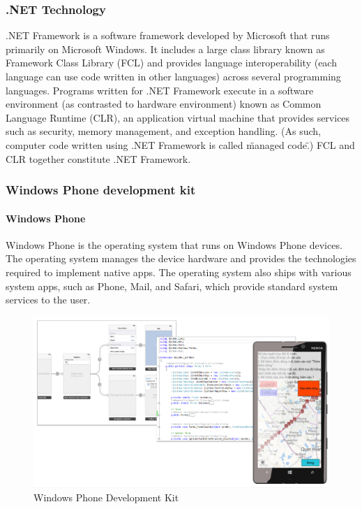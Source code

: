 \subsubsection{.NET Technology}
	.NET Framework is a software framework developed by Microsoft that runs primarily on Microsoft Windows. It includes a large class library known as Framework Class Library (FCL) and provides language interoperability (each language can use code written in other languages) across several programming languages. Programs written for .NET Framework execute in a software environment (as contrasted to hardware environment) known as Common Language Runtime (CLR), an application virtual machine that provides services such as security, memory management, and exception handling. (As such, computer code written using .NET Framework is called \"managed code\".) FCL and CLR together constitute .NET Framework.

\subsubsection{Windows Phone development kit}

	\paragraph{Windows Phone} Windows Phone is the operating system that runs on Windows Phone devices. The operating system manages the device hardware and provides the technologies required to implement native apps. The operating system also ships with various system apps, such as Phone, Mail, and Safari, which provide standard system services to the user.

		\begin{figure}[H]
			\centering
			\includegraphics[scale=0.4]{Chapters/Fig/Windows-Phone-development-kit.png}
			\caption{Windows Phone Development Kit}
			\label{fig:wp_dev_kit}
		\end{figure}

